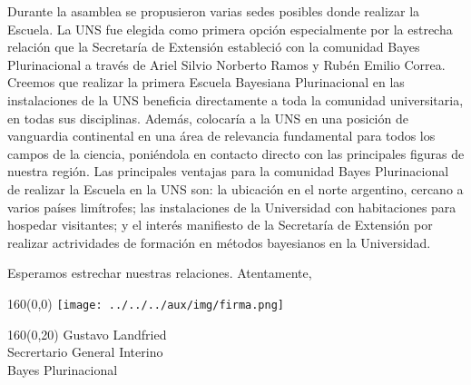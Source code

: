 \documentclass[a4paper,10pt]{letter}
\begin{document}
\begin{letter}
\hspace{1cm}
Durante la asamblea se propusieron varias sedes posibles donde realizar la Escuela.
%
La UNS fue elegida como primera opción especialmente por la estrecha relación que la Secretaría de Extensión estableció con la comunidad Bayes Plurinacional a través de Ariel Silvio Norberto Ramos y Rubén Emilio Correa.
%
Creemos que realizar la primera Escuela Bayesiana Plurinacional en las instalaciones de la UNS beneficia directamente a toda la comunidad universitaria, en todas sus disciplinas.
%
Además, colocaría a la UNS en una posición de vanguardia continental en una área de relevancia fundamental para todos los campos de la ciencia, poniéndola en contacto directo con las principales figuras de nuestra región.
%
Las principales ventajas para la comunidad Bayes Plurinacional de realizar la Escuela en la UNS son: la ubicación en el norte argentino, cercano a varios países limítrofes; las instalaciones de la Universidad con habitaciones para hospedar visitantes; y el interés manifiesto de la Secretaría de Extensión por realizar actrividades de formación en métodos bayesianos en la Universidad.


\hspace{1cm}
Esperamos estrechar nuestras relaciones. Atentamente,

\vspace{.3cm}

\begin{textblock}{160}(0,0)
\phantom{.} \hfill \texttt{[image: ../../../aux/img/firma.png]}\hspace{2cm}\phantom{.} \\[0cm]
\end{textblock}
\begin{textblock}{160}(0,20)
 \phantom{.} \hfill Gustavo Landfried \hspace{2.5cm}\phantom{.}\\ \small
\phantom{.} \hfill Secrertario General Interino \hspace{2.5cm}\phantom{.}\\
\phantom{.} \hfill Bayes Plurinacional \hspace{2.5cm}\phantom{.}\\
\end{textblock}

%
%



\end{letter}
\end{document}
